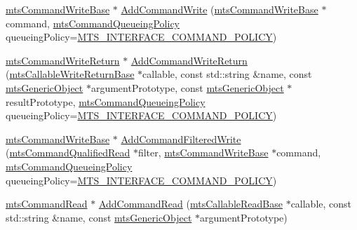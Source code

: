 \begin{DoxyCompactItemize}
\item 
\hyperlink{classmts_command_write_base}{mts\-Command\-Write\-Base} $\ast$ \hyperlink{classmts_interface_provided_acadf7fa0aa311831ccb7b2c852a057d3}{Add\-Command\-Write} (\hyperlink{classmts_command_write_base}{mts\-Command\-Write\-Base} $\ast$command, \hyperlink{mts_forward_declarations_8h_aa2ac24035e136fa1689dcc2854c63fc7}{mts\-Command\-Queueing\-Policy} queueing\-Policy=\hyperlink{mts_forward_declarations_8h_aa2ac24035e136fa1689dcc2854c63fc7a4f444b4120a5e2efd084e2e5a214f5c8}{M\-T\-S\-\_\-\-I\-N\-T\-E\-R\-F\-A\-C\-E\-\_\-\-C\-O\-M\-M\-A\-N\-D\-\_\-\-P\-O\-L\-I\-C\-Y})
\item 
\hyperlink{classmts_command_write_return}{mts\-Command\-Write\-Return} $\ast$ \hyperlink{classmts_interface_provided_ad6f8a29f43faea5dd7f5cb128f13d650}{Add\-Command\-Write\-Return} (\hyperlink{classmts_callable_write_return_base}{mts\-Callable\-Write\-Return\-Base} $\ast$callable, const std\-::string \&name, const \hyperlink{classmts_generic_object}{mts\-Generic\-Object} $\ast$argument\-Prototype, const \hyperlink{classmts_generic_object}{mts\-Generic\-Object} $\ast$result\-Prototype, \hyperlink{mts_forward_declarations_8h_aa2ac24035e136fa1689dcc2854c63fc7}{mts\-Command\-Queueing\-Policy} queueing\-Policy=\hyperlink{mts_forward_declarations_8h_aa2ac24035e136fa1689dcc2854c63fc7a4f444b4120a5e2efd084e2e5a214f5c8}{M\-T\-S\-\_\-\-I\-N\-T\-E\-R\-F\-A\-C\-E\-\_\-\-C\-O\-M\-M\-A\-N\-D\-\_\-\-P\-O\-L\-I\-C\-Y})
\item 
\hyperlink{classmts_command_write_base}{mts\-Command\-Write\-Base} $\ast$ \hyperlink{classmts_interface_provided_ad4c7b4c4523622b7b8e1d47bffabfc90}{Add\-Command\-Filtered\-Write} (\hyperlink{classmts_command_qualified_read}{mts\-Command\-Qualified\-Read} $\ast$filter, \hyperlink{classmts_command_write_base}{mts\-Command\-Write\-Base} $\ast$command, \hyperlink{mts_forward_declarations_8h_aa2ac24035e136fa1689dcc2854c63fc7}{mts\-Command\-Queueing\-Policy} queueing\-Policy=\hyperlink{mts_forward_declarations_8h_aa2ac24035e136fa1689dcc2854c63fc7a4f444b4120a5e2efd084e2e5a214f5c8}{M\-T\-S\-\_\-\-I\-N\-T\-E\-R\-F\-A\-C\-E\-\_\-\-C\-O\-M\-M\-A\-N\-D\-\_\-\-P\-O\-L\-I\-C\-Y})
\item 
\hyperlink{classmts_command_read}{mts\-Command\-Read} $\ast$ \hyperlink{classmts_interface_provided_a440a0f5457e6d9128d016eca75f19610}{Add\-Command\-Read} (\hyperlink{classmts_callable_read_base}{mts\-Callable\-Read\-Base} $\ast$callable, const std\-::string \&name, const \hyperlink{classmts_generic_object}{mts\-Generic\-Object} $\ast$argument\-Prototype)

\end{DoxyCompactItemize}
